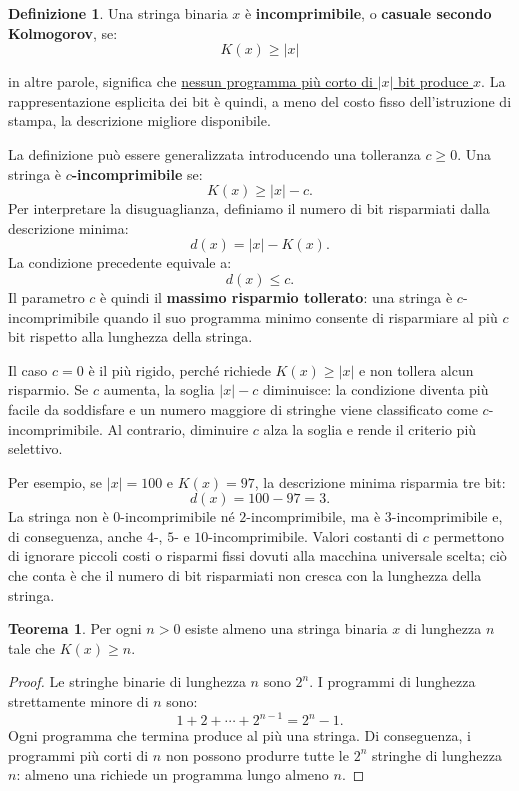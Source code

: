 \documentclass{article}
\theoremstyle{definition}
\newtheorem{theorem}{Teorema}[section] %
\newtheorem{definizione}{Definizione}[section]
\numberwithin{equation}{section}
\begin{document}
\begin{definizione}
    Una stringa binaria $x$ è \textbf{incomprimibile}, o
    \textbf{casuale secondo Kolmogorov}, se:
    \[
        K(x)\geq |x|
    \]
\end{definizione}
in altre parole, significa che \uline{nessun programma più corto di $|x|$ bit produce $x$}. La rappresentazione esplicita dei bit è quindi, a meno del costo fisso dell'istruzione di stampa, la descrizione migliore disponibile.

\medskip

La definizione può essere generalizzata introducendo una tolleranza
$c\geq 0$. Una stringa è \textbf{$c$-incomprimibile} se:
\[
    K(x)\geq |x|-c.
\]
Per interpretare la disuguaglianza, definiamo il numero di bit risparmiati
dalla descrizione minima:
\[
    d(x)=|x|-K(x).
\]
La condizione precedente equivale a:
\[
    d(x)\leq c.
\]
Il parametro $c$ è quindi il \textbf{massimo risparmio tollerato}: una stringa
è $c$-incomprimibile quando il suo programma minimo consente di risparmiare al
più $c$ bit rispetto alla lunghezza della stringa.

Il caso $c=0$ è il più rigido, perché richiede $K(x)\geq |x|$ e non tollera
alcun risparmio. Se $c$ aumenta, la soglia $|x|-c$ diminuisce: la condizione
diventa più facile da soddisfare e un numero maggiore di stringhe viene
classificato come $c$-incomprimibile. Al contrario, diminuire $c$ alza la
soglia e rende il criterio più selettivo.

Per esempio, se $|x|=100$ e $K(x)=97$, la descrizione minima risparmia tre bit:
\[
    d(x)=100-97=3.
\]
La stringa non è $0$-incomprimibile né $2$-incomprimibile, ma è
$3$-incomprimibile e, di conseguenza, anche $4$-, $5$- e
$10$-incomprimibile. Valori costanti di $c$ permettono di ignorare piccoli
costi o risparmi fissi dovuti alla macchina universale scelta; ciò che conta è
che il numero di bit risparmiati non cresca con la lunghezza della stringa.

\begin{theorem}\label{theorem_incompressible_strings_exist}
    Per ogni $n>0$ esiste almeno una stringa binaria $x$ di lunghezza $n$ tale
    che $K(x)\geq n$.
\end{theorem}

\begin{proof}
    Le stringhe binarie di lunghezza $n$ sono $2^n$. I programmi di lunghezza
    strettamente minore di $n$ sono:
    \[
        1+2+\cdots+2^{n-1}=2^n-1.
    \]
    Ogni programma che termina produce al più una stringa. Di conseguenza, i
    programmi più corti di $n$ non possono produrre tutte le $2^n$ stringhe di
    lunghezza $n$: almeno una richiede un programma lungo almeno $n$.
\end{proof}
\end{document}

